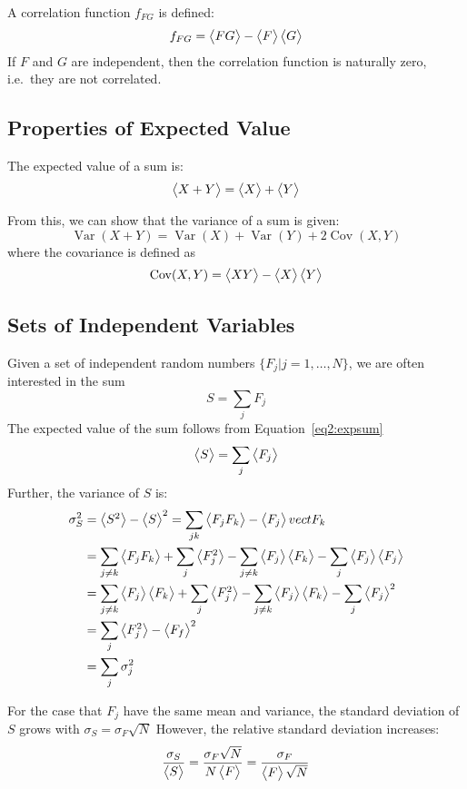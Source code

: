 A correlation function \(f_{FG}\) is defined:
\begin{equation}
	f_{FG}=\vect{FG}-\vect{F}\vect{G}\label{eq2:correlation}
\end{equation}
If \(F\) and \(G\) are independent, then the correlation function is naturally zero, i.e.\ they are not correlated.

\subsection{Properties of Expected Value}
The expected value of a sum is:
\begin{equation}
	\vect{X+Y}=\vect{X}+\vect{Y}\label{eq2:expsum}
\end{equation}

From this, we can show that the variance of a sum is given:
\begin{equation}
	\operatorname{Var}(X+Y)=\operatorname{Var}(X)+\operatorname{Var}(Y)+2\operatorname{Cov}(X,Y)\label{eq2:varsum}
\end{equation}
where the covariance is defined as
\begin{equation}
	\operatorname{Cov}(X,Y)=\vect{XY}-\vect{X}\vect{Y}
\end{equation}

\subsection{Sets of Independent Variables}
Given a set of independent random numbers \(\{F_j | j=1,\ldots,N\}\), we are often interested in the sum
\[S=\sum_j F_j\]
The expected value of the sum follows from Equation~\ref{eq2:expsum}
\[\vect{S}=\sum_j \vect{F_j}\]
Further, the variance of \(S\) is:
\begin{align*}
	\sigma_S^2&=\vect{S^2}-\vect{S}^2=\sum_{jk}\vect{F_j F_k}-\vect{F_j}vect{F_k}\\
		  &=\sum_{j\neq k}\vect{F_j F_k}+\sum_j\vect{F_j^2}-\sum_{j\neq k}\vect{F_j}\vect{F_k}-\sum_j\vect{F_j}\vect{F_j}\\
		  &=\sum_{j\neq k}\vect{F_j}\vect{F_k}+\sum_j\vect{F_j^2}-\sum_{j\neq k}\vect{F_j}\vect{F_k}-\sum_j\vect{F_j}^2\\
		  &=\sum_j\vect{F_j^2}-\vect{F_f}^2\\
		  &=\sum_j\sigma_j^2
\end{align*}

For the case that \(F_j\) have the same mean and variance, the standard deviation of \(S\) grows with \(\sigma_S=\sigma_F\sqrt{N}\)
However, the relative standard deviation increases:
\begin{equation}
\frac{\sigma_S}{\vect{S}}=\frac{\sigma_F\sqrt{N}}{N\vect{F}}=\frac{\sigma_F}{\vect{F}\sqrt{N}}\label{eq2:relstdev}
\end{equation}

